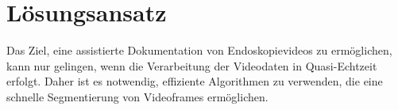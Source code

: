 \chapter{Lösungsansatz}\label{ch:approach}
Das Ziel, eine assistierte Dokumentation von Endoskopievideos zu ermöglichen, kann nur gelingen, wenn die
Verarbeitung der Videodaten in Quasi-Echtzeit erfolgt. Daher ist es notwendig, effiziente Algorithmen zu verwenden, die eine schnelle Segmentierung von Videoframes ermöglichen.    